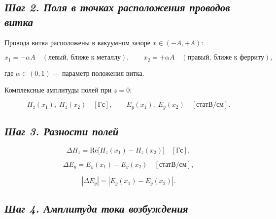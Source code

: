 \documentclass[11pt]{article}
\begin{document}
    \subsection{\texorpdfstring{\emph{Шаг 2. Поля в точках расположения
проводов
витка}}{Шаг 2. Поля в точках расположения проводов витка}}\label{ux448ux430ux433-2.-ux43fux43eux43bux44f-ux432-ux442ux43eux447ux43aux430ux445-ux440ux430ux441ux43fux43eux43bux43eux436ux435ux43dux438ux44f-ux43fux440ux43eux432ux43eux434ux43eux432-ux432ux438ux442ux43aux430}

Провода витка расположены в вакуумном зазоре \(x \in (-A, +A)\):

\begin{equation*}
    x_1 = -\alpha A \quad (\text{левый, ближе к металлу}),
    \qquad
    x_2 = +\alpha A \quad (\text{правый, ближе к ферриту}),
\end{equation*}

где \(\alpha \in (0, 1)\) -\/-\/- параметр положения витка.

Комплексные амплитуды полей при \(z = 0\):

\begin{equation*}
    H_z(x_1),\; H_z(x_2) \quad [\text{Гс}],
    \qquad
    E_y(x_1),\; E_y(x_2) \quad [\text{статВ/см}].
\end{equation*}

    \subsection{\texorpdfstring{\emph{Шаг 3. Разности
полей}}{Шаг 3. Разности полей}}\label{ux448ux430ux433-3.-ux440ux430ux437ux43dux43eux441ux442ux438-ux43fux43eux43bux435ux439}

\begin{equation*}
    \Delta H_z = \mathrm{Re}\bigl[H_z(x_1) - H_z(x_2)\bigr]
    \quad [\text{Гс}],
\end{equation*}

\begin{equation*}
    \Delta E_y = E_y(x_1) - E_y(x_2)
    \quad [\text{статВ/см}],
\end{equation*}

\begin{equation*}
    |\Delta E_y| = |E_y(x_1) - E_y(x_2)|.
\end{equation*}

    \subsection{\texorpdfstring{\emph{Шаг 4. Амплитуда тока
возбуждения}}{Шаг 4. Амплитуда тока возбуждения}}\label{ux448ux430ux433-4.-ux430ux43cux43fux43bux438ux442ux443ux434ux430-ux442ux43eux43aux430-ux432ux43eux437ux431ux443ux436ux434ux435ux43dux438ux44f}
\end{document}
